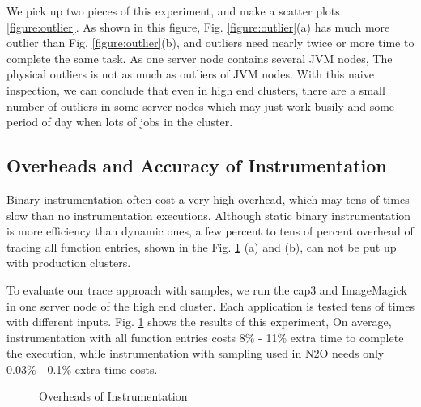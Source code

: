 We pick up two pieces of this experiment, and make a scatter plots \ref{figure:outlier}. As shown in this figure, Fig.  \ref{figure:outlier}(a) has much more outlier than Fig.  \ref{figure:outlier}(b), and outliers need nearly twice or more time to complete the same task. As one server node contains several JVM nodes, The physical outliers is not as much as outliers of JVM nodes. With this naive inspection, we can conclude that even in high end clusters, there are a small number of outliers in some server nodes which may just work busily and some period of day when lots of jobs in the cluster.

\subsection{Overheads and Accuracy of Instrumentation}

Binary instrumentation often cost a very high overhead, which may tens of times slow than no instrumentation executions. Although static binary instrumentation is more efficiency than dynamic ones, a few percent to tens of percent overhead of tracing all function entries, shown in the Fig. \ref{figure:overheads} (a) and (b), can not be put up with production clusters. 

To evaluate our trace approach with samples, we run the cap3 and ImageMagick in one server node of the high end cluster. Each application is tested tens of times with different inputs. Fig.  \ref{figure:overheads} shows the results of this experiment, On average, instrumentation with all function entries costs 8\% - 11\% extra time to complete the execution, while instrumentation with sampling used in N2O needs only 0.03\% - 0.1\% extra time costs.

\begin{figure}
\centering
{}
\caption{Overheads of Instrumentation}
\label{figure:overheads}
\end{figure}

